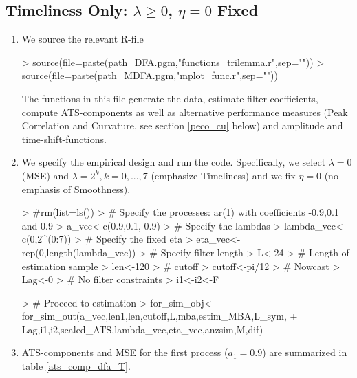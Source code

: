 \documentclass[a4paper]{book}
\begin{document}
\subsection{Timeliness Only: $\lambda\geq0$, $\eta=0$ Fixed}

\begin{enumerate}
\item We source the relevant R-file 
\begin{Schunk}
\begin{Sinput}
> source(file=paste(path_DFA.pgm,"functions_trilemma.r",sep=""))
> source(file=paste(path_MDFA.pgm,"mplot_func.r",sep=""))
\end{Sinput}
\end{Schunk}
The functions in this file generate the data, estimate filter coefficients, compute  ATS-components as well as alternative performance measures (Peak Correlation and Curvature, see section \ref{peco_cu} below) and amplitude and time-shift-functions. 
\item We specify the empirical design and run the code. Specifically, we select $\lambda=0$ (MSE) and $\lambda=2^k, k=0,...,7$ (emphasize Timeliness) and we fix $\eta=0$ (no emphasis of Smoothness).
\begin{Schunk}
\begin{Sinput}
> #rm(list=ls())
> # Specify the processes: ar(1) with coefficients -0.9,0.1 and 0.9
> a_vec<-c(0.9,0.1,-0.9)
> # Specify the lambdas
> lambda_vec<-c(0,2^(0:7))
> # Specify the fixed eta
> eta_vec<-rep(0,length(lambda_vec))
> # Specify filter length
> L<-24
> # Length of estimation sample
> len<-120
> # cutoff
> cutoff<-pi/12
> # Nowcast
> Lag<-0
> # No filter constraints
> i1<-i2<-F
\end{Sinput}
\end{Schunk}
\begin{Schunk}
\begin{Sinput}
> # Proceed to estimation
> for_sim_obj<-for_sim_out(a_vec,len1,len,cutoff,L,mba,estim_MBA,L_sym,
+               Lag,i1,i2,scaled_ATS,lambda_vec,eta_vec,anzsim,M,dif)
\end{Sinput}
\end{Schunk}
\item ATS-components and MSE for the first process ($a_1=0.9$) are summarized in table \ref{ats_comp_dfa_T}.\\
\begin{table}[ht]
\centering
\begin{tabular}{rrrrrr}

\end{tabular}
\end{table}
\end{enumerate}
\end{document}
